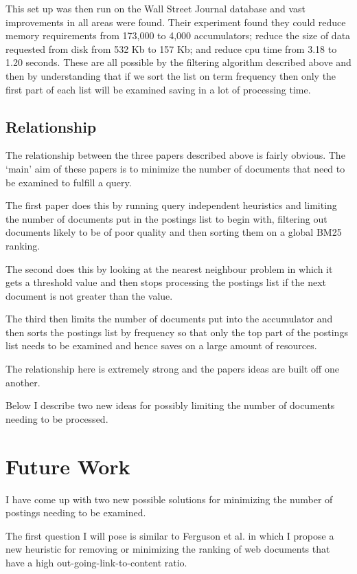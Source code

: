 \documentclass{acm_proc_article-sp}
\begin{document}
This set up was then run on the Wall Street Journal database and vast improvements in all areas were found. Their experiment found they could reduce memory requirements from 173,000 to 4,000 accumulators; reduce the size of data requested from disk from 532 Kb to 157 Kb; and reduce cpu time from 3.18 to 1.20 seconds. These are all possible by the filtering algorithm described above and then by understanding that if we sort the list on term frequency then only the first part of each list will be examined saving in a lot of processing time.

\subsection{Relationship}

The relationship between the three papers described above is fairly obvious. The `main' aim of these papers is to minimize the number of documents that need to be examined to fulfill a query. 

The first paper does this by running query independent heuristics and limiting the number of documents put in the postings list to begin with, filtering out documents likely to be of poor quality and then sorting them on a global BM25 ranking.

The second does this by looking at the nearest neighbour problem in which it gets a threshold value and then stops processing the postings list if the next document is not greater than the value.

The third then limits the number of documents put into the accumulator and then sorts the postings list by frequency so that only the top part of the postings list needs to be examined and hence saves on a large amount of resources.

The relationship here is extremely strong and the papers ideas are built off one another.

Below I describe two new ideas for possibly limiting the number of documents needing to be processed.

\section{Future Work}
I have come up with two new possible solutions for minimizing the number of postings needing to be examined. 

The first question I will pose is similar to Ferguson et al. in which I propose a new heuristic for removing or minimizing the ranking of web documents that have a high out-going-link-to-content ratio. 
\end{document}
